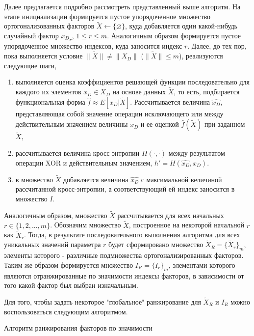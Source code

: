 \documentclass[runningheads]{llncs}
\begin{document}
Далее предлагается подробно рассмотреть представленный выше алгоритм. На этапе инициализации формируется пустое упорядоченное множество ортогонализованных факторов  $\tilde{X} \gets \{\varnothing\}$, куда добавляется один какой-нибудь случайный фактор ${x_D}_r$, $1 \leq r \leq m$. Аналогичным образом формируется пустое упорядоченное множество индексов, куда заносится индекс $r$. Далее, до тех пор, пока выполняется условие $\|\tilde{X}\| \neq \|X_D\|$ ($\|\tilde{X}\| \leq m$), реализуются следующие шаги,
\begin{enumerate}
  \item выполняется оценка коэффициентов решающей функции последовательно для каждого их элементов $x_D \in X_D$  на основе данных $\tilde{X}$, то есть, подбирается функциональная форма $\hat{f} \approx E[x_D | \tilde{X}]$. Рассчитывается величина $\hat{x_D}$, представляющая собой значение операции исключающего или между действительным значением величины $x_D$ и ее оценкой $\hat{f}(\tilde{X})$ при заданном $\tilde{X}$,
  \item рассчитывается величина кросс-энтропии $H(\cdot, \cdot)$ между результатом операции XOR и действительным значением,  $h' = H(\hat{x_D}, x_D)$.
  \item в множество $\tilde{X}$ добавляется величина $\hat{x_D}$ с максимальной величиной рассчитанной кросс-энтропии, а соответствующий ей индекс заносится в множество $I$.
\end{enumerate}
Аналогичным образом, множество $\tilde{X}$ рассчитывается для всех начальных $r \in \{1, 2, ..., m\}$. Обозначим множество $\tilde{X}$, построенное на некоторой начальной $r$ как $\tilde{X}_r$. Тогда, в результате последовательного выполнения алгоритма для всех уникальных значений параметра $r$ будет сформировано множество $\tilde{X}_R = \{\tilde{X}_r\}_m$, элементы которого - различные подмножества ортогонализированных факторов. Таким же образом формируется множество $I_R = \{I_r\}_m$, элементами которого являются отранжированные по значимости индексы факторов, в зависимости от того какой фактор был выбран изначальным. \par
Для того, чтобы задать некоторое "глобальное" ранжирование для $\tilde{X}_R$ и $I_R$ можно воспользоваться следующим алгоритмом.

\begin{algorithm}[H]
 \caption{Алгоритм ранжирования факторов по значимости}
\end{algorithm}
\end{document}
